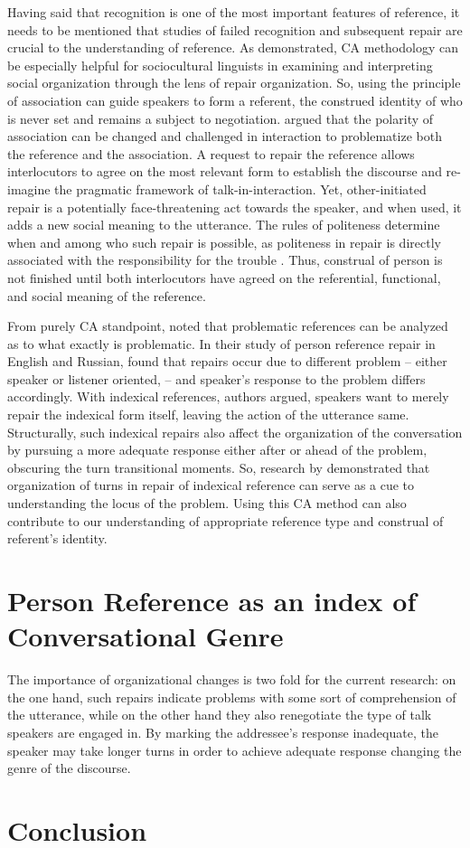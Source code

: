 \documentclass[12pt]{article}
\begin{document}
Having said that recognition is one of the most important features of reference, it needs to be mentioned that studies of failed recognition and subsequent repair are crucial to the understanding of reference. As \textcite{sidnell2008} demonstrated, CA methodology can be especially helpful for sociocultural linguists in examining and interpreting social organization through the lens of repair organization. So, using the principle of association can guide speakers to form a referent, the construed identity of who is never set and remains a subject to negotiation. \textcite{blythe2009} argued that the polarity of association can be changed and challenged in interaction to problematize both the reference and the association. A request to repair the reference allows interlocutors to agree on the most relevant form to establish the discourse and re-imagine the pragmatic framework of talk-in-interaction. Yet, other-initiated repair is a potentially face-threatening act towards the speaker, and when used, it adds a new social meaning to the utterance. The rules of politeness determine when and among who such repair is possible, as politeness in repair is directly associated with the responsibility for the trouble \parencite{sidnell2008}. Thus, construal of person is not finished until both interlocutors have agreed on the referential, functional, and social meaning of the reference.

From purely CA standpoint, \textcite{bolden2012} noted that problematic references can be analyzed as to what exactly is problematic. In their study of person reference repair in English and Russian, \textcite{bolden2012} found that repairs occur due to different problem -- either speaker or listener oriented, -- and speaker's response to the problem differs accordingly. With indexical references, authors argued, speakers want to merely repair the indexical form itself, leaving the action of the utterance same. Structurally, such indexical repairs also affect the organization of the conversation by pursuing a more adequate response either after or ahead of the problem, obscuring the turn transitional moments. So, research by \textcite{bolden2012} demonstrated that organization of turns in repair of indexical reference can serve as a cue to understanding the locus of the problem. Using this CA method can also contribute to our understanding of appropriate reference type and construal of referent's identity.

\section{Person Reference as an index of Conversational Genre}
The importance of organizational changes is two fold for the current research: on the one hand, such repairs indicate problems with some sort of comprehension of the utterance, while on the other hand they also renegotiate the type of talk speakers are engaged in. By marking the addressee's response inadequate, the speaker may take longer turns in order to achieve adequate response changing the genre of the discourse.

\section{Conclusion}

\printbibliography
\end{document}
